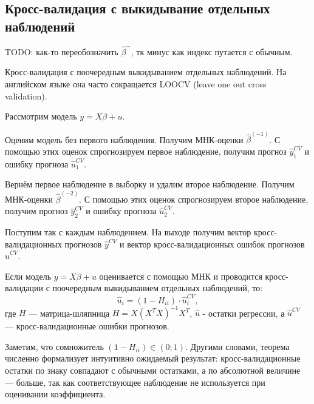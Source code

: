 \documentclass[12pt]{article}
\newcommand{\hb}{\hat{\beta}}
\begin{document}
\subsection{Кросс-валидация с выкидывание отдельных наблюдений}

TODO: как-то переобозначить $\hb^-$, тк минус как индекс путается с обычным. 

\begin{definition}[LOOCV]
Кросс-валидация с поочередным выкидыванием отдельных наблюдений. 
На английском языке она часто сокращается LOOCV (leave one out cross validation).

Рассмотрим модель $y=X\beta + u$. 

Оценим модель без первого наблюдения. Получим МНК-оценки $\hb^{(-1)}$.
С помощью этих оценок спрогнозируем первое наблюдение, получим прогноз $\hat y_1^{CV}$ и ошибку прогноза $\hat u_1^{CV}$.

Вернём первое наблюдение в выборку и удалим второе наблюдение. Получим МНК-оценки $\hb^{(-2)}$.
С помощью этих оценок спрогнозируем второе наблюдение, получим прогноз $\hat y_2^{CV}$ и ошибку прогноза $\hat u_2^{CV}$.

Поступим так с каждым наблюдением. На выходе получим вектор кросс-валидационных прогнозов $\hat y^{CV}$ и вектор кросс-валидационных ошибок прогнозов $\hat u^{CV}$.    
\end{definition}

\begin{theorem}
Если модель $y=X\beta + u$ оценивается с помощью МНК и проводится кросс-валидации с поочередным выкидыванием отдельных наблюдений, то:
\[
\hat u_i = (1 - H_{ii}) \cdot \hat u_i^{CV},
\]
где $H$ — матрица-шляпница $H = X(X^TX)^{-1}X^T$, $\hat u$ - остатки регрессии, а $\hat u^{CV}$ — кросс-валидационные ошибки прогнозов.
\end{theorem}

Заметим, что сомножитель $(1 - H_{ii}) \in (0;1)$. 
Другими словами, теорема численно формализует интуитивно ожидаемый результат: кросс-валидационные остатки по знаку совпадают с обычными остатками, а по абсолютной величине — больше, так как соответствующее наблюдение не используется при оценивании коэффициента. 
\end{document}

